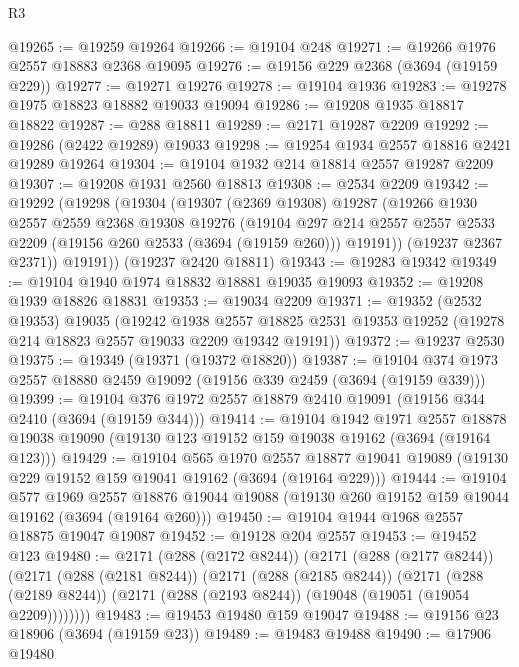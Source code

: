 \begin{lexlean}{R3}
\begin{coremodule}
@19265 := @19259 @19264
@19266 := @19104 @248
@19271 := @19266 @1976 @2557 @18883 @2368 @19095
@19276 := @19156 @229 @2368 (@3694 (@19159 @229))
@19277 := @19271 @19276
@19278 := @19104 @1936
@19283 := @19278 @1975 @18823 @18882 @19033 @19094
@19286 := @19208 @1935 @18817 @18822
@19287 := @288 @18811
@19289 := @2171 @19287 @2209
@19292 := @19286 (@2422 @19289) @19033
@19298 := @19254 @1934 @2557 @18816 @2421 @19289 @19264
@19304 := @19104 @1932 @214 @18814 @2557 @19287 @2209
@19307 := @19208 @1931 @2560 @18813
@19308 := @2534 @2209
@19342 := @19292
    (@19298
      (@19304
        (@19307
          (@2369 @19308)
          @19287
          (@19266
            @1930
            @2557
            @2559
            @2368
            @19308
            @19276
            (@19104
              @297
              @214
              @2557
              @2557
              @2533
              @2209
              (@19156 @260 @2533 (@3694 (@19159 @260)))
              @19191))
          (@19237 @2367 @2371))
        @19191))
    (@19237 @2420 @18811)
@19343 := @19283 @19342
@19349 := @19104 @1940 @1974 @18832 @18881 @19035 @19093
@19352 := @19208 @1939 @18826 @18831
@19353 := @19034 @2209
@19371 := @19352
    (@2532 @19353)
    @19035
    (@19242
      @1938
      @2557
      @18825
      @2531
      @19353
      @19252
      (@19278 @214 @18823 @2557 @19033 @2209 @19342 @19191))
@19372 := @19237 @2530
@19375 := @19349 (@19371 (@19372 @18820))
@19387 := @19104 @374 @1973 @2557 @18880 @2459 @19092 (@19156 @339 @2459 (@3694 (@19159 @339)))
@19399 := @19104 @376 @1972 @2557 @18879 @2410 @19091 (@19156 @344 @2410 (@3694 (@19159 @344)))
@19414 := @19104
    @1942
    @1971
    @2557
    @18878
    @19038
    @19090
    (@19130 @123 @19152 @159 @19038 @19162 (@3694 (@19164 @123)))
@19429 := @19104
    @565
    @1970
    @2557
    @18877
    @19041
    @19089
    (@19130 @229 @19152 @159 @19041 @19162 (@3694 (@19164 @229)))
@19444 := @19104
    @577
    @1969
    @2557
    @18876
    @19044
    @19088
    (@19130 @260 @19152 @159 @19044 @19162 (@3694 (@19164 @260)))
@19450 := @19104 @1944 @1968 @2557 @18875 @19047 @19087
@19452 := @19128 @204 @2557
@19453 := @19452 @123
@19480 := @2171
    (@288 (@2172 @8244))
    (@2171
      (@288 (@2177 @8244))
      (@2171
        (@288 (@2181 @8244))
        (@2171
          (@288 (@2185 @8244))
          (@2171
            (@288 (@2189 @8244))
            (@2171 (@288 (@2193 @8244)) (@19048 (@19051 (@19054 @2209))))))))
@19483 := @19453 @19480 @159 @19047
@19488 := @19156 @23 @18906 (@3694 (@19159 @23))
@19489 := @19483 @19488
@19490 := @17906 @19480

\end{coremodule}
\end{lexlean}

